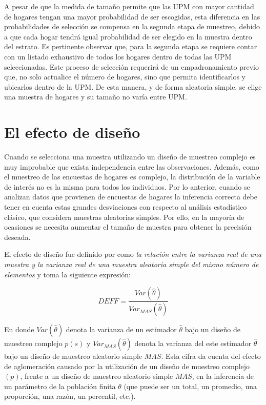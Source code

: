 \documentclass[
  12pt,
  spanish,
]{book}
\begin{document}
A pesar de que la medida de tamaño permite que las UPM con mayor cantidad de hogares tengan una mayor probabilidad de ser escogidas, esta diferencia en las probabilidades de selección se compensa en la segunda etapa de muestreo, debido a que cada hogar tendrá igual probabilidad de ser elegido en la muestra dentro del estrato. Es pertinente observar que, para la segunda etapa se requiere contar con un listado exhaustivo de todos los hogares dentro de todas las UPM seleccionadas. Este proceso de selección requerirá de un empadronamiento previo que, no solo actualice el número de hogares, sino que permita identificarlos y ubicarlos dentro de la UPM. De esta manera, y de forma aleatoria simple, se elige una muestra de hogares y su tamaño no varía entre UPM.

\hypertarget{el-efecto-de-diseuxf1o}{%
\chapter{El efecto de diseño}\label{el-efecto-de-diseuxf1o}}

Cuando se selecciona una muestra utilizando un diseño de muestreo complejo es muy improbable que exista independencia entre las observaciones. Además, como el muestreo de las encuestas de hogares es complejo, la distribución de la variable de interés no es la misma para todos los individuos. Por lo anterior, cuando se analizan datos que provienen de encuestas de hogares la inferencia correcta debe tener en cuenta estas grandes desviaciones con respecto al análisis estadístico clásico, que considera muestras aleatorias simples. Por ello, en la mayoría de ocasiones se necesita aumentar el tamaño de muestra para obtener la precisión deseada.

El efecto de diseño fue definido por \citet[página 258]{Kish_1965} como \emph{la relación entre la varianza real de una muestra y la varianza real de una muestra aleatoria simple del mismo número de elementos} y toma la siguiente expresión:

\[
DEFF=\frac{Var(\hat{\theta})}{Var_{MAS}(\hat{\theta})}
\]

En donde \(Var(\hat{\theta})\) denota la varianza de un estimador \(\hat{\theta}\) bajo un diseño de muestreo complejo \(p(s)\) y \(Var_{MAS}(\hat{\theta})\) denota la varianza del este estimador \(\hat{\theta}\) bajo un diseño de muestreo aleatorio simple \(MAS\). Esta cifra da cuenta del efecto de aglomeración causado por la utilización de un diseño de muestreo complejo \((p)\), frente a un diseño de muestreo aleatorio simple \(MAS\), en la inferencia de un parámetro de la población finita \(\theta\) (que puede ser un total, un promedio, una proporción, una razón, un percentil, etc.).
\end{document}
